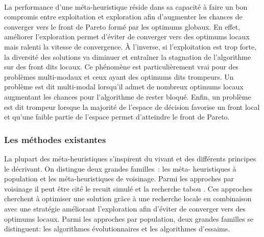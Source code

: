 \paragraph{} %
La performance d’une méta-heuristique réside dans sa capacité à faire un bon
compromis entre exploitation et exploration afin d’augmenter les chances de
converger vers le front de Pareto formé par les optimums globaux. En effet,
améliorer l’exploration permet d’éviter de converger vers des optimums locaux
mais ralenti la vitesse de convergence. À l’inverse, si l’exploitation est trop
forte, la diversité des solutions va diminuer et entraîner la stagnation de
l’algorithme sur des front dits locaux. Ce phénomène est particulièrement vrai
pour des problèmes multi-modaux et ceux ayant des optimums dits trompeurs. Un
problème est dit multi-modal lorsqu’il admet de nombreux optimums locaux
augmentant les chances pour l’algorithme de rester bloqué. Enfin, un problème
est dit trompeur lorsque la majorité de l’espace de décision favorise un front
local et qu’une faible partie de l’espace permet d’atteindre le front de Pareto.


\subsubsection{Les méthodes existantes} %
\label{ssub:les_methodes_existantes}
La plupart des méta-heuristiques s’inspirent du vivant et des différents principes le
décrivant. On distingue deux grandes familles~: les méta- heuristiques à population et les
méta-heuristiques de voisinage. Parmi les approches par
voisinage il peut être cité le recuit simulé et la recherche tabou
\parencite{Paul2010577}. Ces approches cherchent à optimiser une solution grâce à une
recherche locale en combinaison avec une stratégie améliorant l’exploration afin d’éviter
de converger vers des optimums locaux. Parmi les approches par population, deux grandes
familles se distinguent: les algorithmes évolutionnaires et les algorithmes d’essaims.


